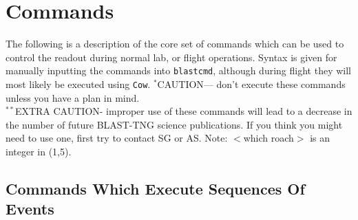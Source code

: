 \section{Commands}\label{commands}
The following is a description of the core set of commands which can be used to control the readout during normal lab, or flight operations. Syntax is given for manually inputting the commands into \texttt{blastcmd}, although during flight they will most likely be executed using \texttt{Cow}.\newline\newline
$^{*}$CAUTION--- don’t execute these commands unless you have a plan in mind.\\
$^{**}$EXTRA CAUTION- improper use of these commands will lead to a decrease in the number of future BLAST-TNG science publications. If you think you might need to use one, first try to contact SG or AS\@.\newline\newline
Note: $<$which roach$>$ is an integer in (1,5).

\subsection{Commands Which Execute Sequences Of Events}

